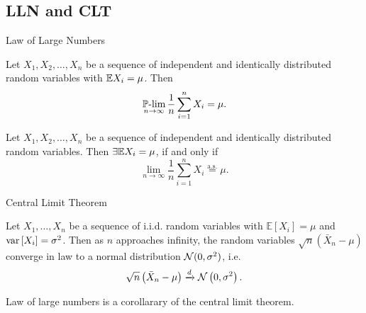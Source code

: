 \subsection{LLN and CLT}
    \begin{frame}{Law of Large Numbers}
        \begin{theorem}[Khinchin]
            Let $X_1, X_2, \dots, X_n$ be a sequence of independent and identically distributed random variables with $\mathbb{E} X_i = \mu$. Then
            \begin{equation}
                \operatorname*{\operatorname{\mathbb{P}-lim}}_{n \to \infty} \frac{1}{n} \sum_{i=1}^n X_i = \mu.
            \end{equation}
        \end{theorem}
        \begin{theorem}[Kolmogorov]
            Let $X_1, X_2, \dots, X_n$ be a sequence of independent and identically distributed random variables. Then $\exists \mathbb{E} X_i = \mu$, if and only if
            \begin{equation}
                \lim_{n \to \infty} \frac{1}{n} \sum_{i=1}^n X_i \overset{\text{a.s.}}{=} \mu.
            \end{equation}
        \end{theorem}
    \end{frame}

    \begin{frame}{Central Limit Theorem}
        \begin{theorem}
            Let $X_1, \dots, X_n$ be a sequence of i.i.d. random variables with $\mathbb{E}[X_i] = \mu$ and $\operatorname*{var}\left[X_i\right] = \sigma^2$. 
            Then as $n$ approaches infinity, the random variables $\sqrt{n}(\bar{X}_n - \mu)$ converge in law to a normal distribution ${\cal N}(0, \sigma^2)$, i.e.
            \begin{equation}
                \sqrt{n}\left(\bar{X}_n - \mu\right) \xrightarrow{d} {\cal N}\left(0,\sigma^2\right).
            \end{equation}
        \end{theorem}
        \begin{nb}
            Law of large numbers is a corollarary of the central limit theorem.
        \end{nb}
    \end{frame}

